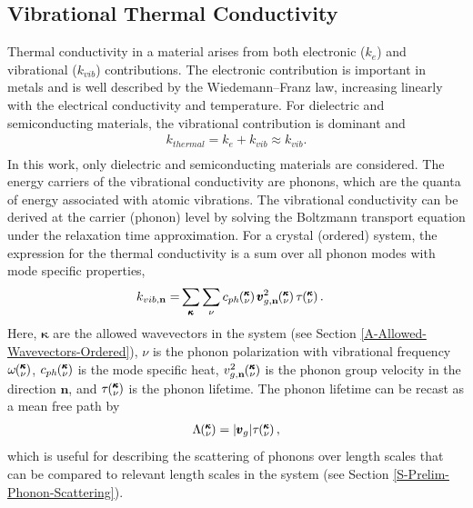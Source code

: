 \documentclass[letterpaper,12pt]{article}
\newcommand{\kv}{\mspace{-4.0mu}\left(\mspace{-8.0mu}\begin{smallmatrix}&\pmb{\kappa} \\&\nu\end{smallmatrix}\mspace{-3.0mu}\right)}
\begin{document}
\subsection{\label{S-Back-Vib-Cond}Vibrational Thermal Conductivity}
Thermal conductivity in a material arises from both electronic ($k_{e}$) and vibrational
($k_{vib}$) contributions.\cite{ashcroft1976,Slack1979} The electronic contribution is important in metals and is well described by the Wiedemann–Franz law, increasing linearly with the electrical conductivity and temperature. For dielectric and semiconducting materials, the vibrational contribution is dominant and
\begin{equation}\label{EQ:M:k_thermal}
\begin{split}
k_{thermal} = k_{e} + k_{vib} \approx k_{vib}. \\
\end{split}
\end{equation}
In this work, only dielectric and semiconducting materials are considered. The energy carriers of the vibrational conductivity are phonons, which are the quanta of energy associated with atomic vibrations.\cite{dove1993,ashcroft1976,srivastava1990,wallace1972} 
The vibrational conductivity can be derived at the carrier (phonon) level by solving the Boltzmann transport equation under the relaxation time approximation.\cite{srivastava1990,ziman2001} For a crystal (ordered) system, the expression for the thermal conductivity is a sum over all phonon modes with mode specific properties,
\begin{equation}\label{EQ:M:k_l,sum}
\begin{split}
k_{vib,\mathbf{n}}=&\sum_{\pmb{\kappa}} \sum_\nu c_{ph}\kv \pmb{v}^{2}_{g,\mathbf{n}}\kv \tau\kv.
\end{split}
\end{equation}
Here, $\pmb{\kappa}$ are the allowed wavevectors in the system (see Section \ref{A-Allowed-Wavevectors-Ordered}), $\nu$ is the phonon polarization with vibrational frequency $\omega \kv$, $c_{ph}\kv$ is the mode specific heat, $v^{2}_{g,\mathbf{n}}\kv$ is the phonon group velocity in the direction $\mathbf{n}$, and $\tau\kv$ is the phonon lifetime. 
The phonon lifetime can be recast as a mean free path by
\begin{equation}\label{EQ:M:phonon_mfp}
\begin{split}
\Lambda\kv = |\pmb{v}_{g}| \tau\kv,
\end{split}
\end{equation}
which is useful for describing the scattering of phonons over length scales that can be compared to relevant length scales in the system (see Section \ref{S-Prelim-Phonon-Scattering}).
\end{document}
